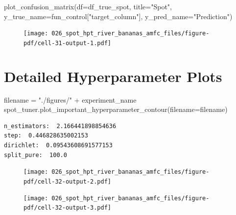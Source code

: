 \documentclass[
  letterpaper,
  DIV=11,
  numbers=noendperiod]{scrreprt}
\newenvironment{Shaded}{\begin{snugshade}}{\end{snugshade}}
\newcommand{\NormalTok}[1]{\textcolor[rgb]{0.00,0.23,0.31}{#1}}
\newcommand{\OperatorTok}[1]{\textcolor[rgb]{0.37,0.37,0.37}{#1}}
\newcommand{\StringTok}[1]{\textcolor[rgb]{0.13,0.47,0.30}{#1}}
\begin{document}
\begin{Shaded}
\begin{Highlighting}[]
\NormalTok{plot\_confusion\_matrix(df}\OperatorTok{=}\NormalTok{df\_true\_spot, title}\OperatorTok{=}\StringTok{"Spot"}\NormalTok{, y\_true\_name}\OperatorTok{=}\NormalTok{fun\_control[}\StringTok{"target\_column"}\NormalTok{], y\_pred\_name}\OperatorTok{=}\StringTok{"Prediction"}\NormalTok{)}
\end{Highlighting}
\end{Shaded}

\begin{figure}[H]

{\centering \texttt{[image: 026\_spot\_hpt\_river\_bananas\_amfc\_files/figure-pdf/cell-31-output-1.pdf]}

}

\end{figure}

\hypertarget{detailed-hyperparameter-plots-7}{%
\section{Detailed Hyperparameter
Plots}\label{detailed-hyperparameter-plots-7}}

\begin{Shaded}
\begin{Highlighting}[]
\NormalTok{filename }\OperatorTok{=} \StringTok{"./figures/"} \OperatorTok{+}\NormalTok{ experiment\_name}
\NormalTok{spot\_tuner.plot\_important\_hyperparameter\_contour(filename}\OperatorTok{=}\NormalTok{filename)}
\end{Highlighting}
\end{Shaded}

\begin{verbatim}
n_estimators:  2.166441898854636
step:  0.446828635002153
dirichlet:  0.09543608691577153
split_pure:  100.0
\end{verbatim}

\begin{figure}[H]

{\centering \texttt{[image: 026\_spot\_hpt\_river\_bananas\_amfc\_files/figure-pdf/cell-32-output-2.pdf]}

}

\end{figure}

\begin{figure}[H]

{\centering \texttt{[image: 026\_spot\_hpt\_river\_bananas\_amfc\_files/figure-pdf/cell-32-output-3.pdf]}

}

\end{figure}
\end{document}
